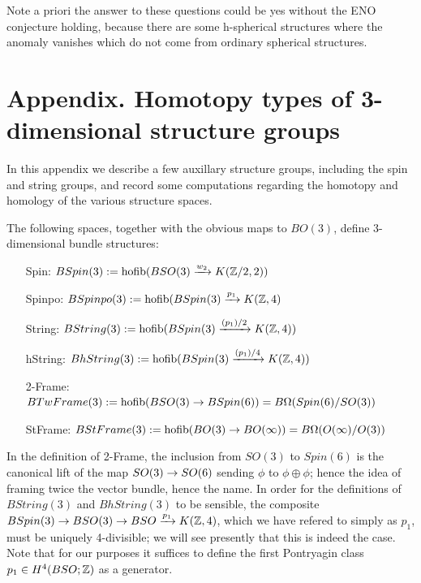 \documentclass{amsart}
\begin{document}
Note a priori the answer to these questions could be yes without the ENO conjecture holding, because there are some h-spherical structures where the anomaly vanishes which do not come from ordinary spherical structures.



\appendix

\renewcommand{\thetheorem}{A.\arabic{theorem}}
\setcounter{theorem}{0}
\section*{Appendix.  Homotopy types of 3-dimensional structure groups}

In this appendix we describe a few auxillary structure groups, including the spin and string groups, and record some computations regarding the homotopy and homology of the various structure spaces.

\begin{definition}
The following spaces, together with the obvious maps to $BO(3)$, define 3-dimensional bundle structures:
\begin{itemize}
\item[Spin:] $BSpin(3) := \operatorname{hofib}(BSO(3) \xrightarrow{w_2} K(\mathbb Z/2,2))$
\item[Spinpo:] $BSpinpo(3) := \operatorname{hofib}(BSpin(3) \xrightarrow{p_1} K(\mathbb Z,4)$
\item[String:] $BString(3) := \operatorname{hofib}(BSpin(3) \xrightarrow{(p_1)/2} K(\mathbb Z,4))$
\item[hString:] $BhString(3) := \operatorname{hofib}(BSpin(3) \xrightarrow{(p_1)/4} K(\mathbb Z,4))$
\item[2-Frame:] $BTwFrame(3) := \operatorname{hofib}(BSO(3) \rightarrow BSpin(6)) = B\Omega(Spin(6)/SO(3))$
\item[StFrame:] $BStFrame(3) := \operatorname{hofib}(BO(3) \rightarrow BO(\infty)) = B\Omega(O(\infty)/O(3))$
\end{itemize}
\end{definition}

\nid In the definition of 2-Frame, the inclusion from $SO(3)$ to $Spin(6)$ is the canonical lift of the map $SO(3) \rightarrow SO(6)$ sending $\phi$ to $\phi \oplus \phi$; hence the idea of framing twice the vector bundle, hence the name.  In order for the definitions of $BString(3)$ and $BhString(3)$ to be sensible, the composite $BSpin(3) \rightarrow BSO(3) \rightarrow BSO \xrightarrow{p_1} K(\mathbb Z,4)$, which we have refered to simply as $p_1$, must be uniquely 4-divisible; we will see presently that this is indeed the case.  Note that for our purposes it suffices to define the first Pontryagin class $p_1 \in H^4(BSO;\mathbb Z)$ as a generator.
\end{document}
